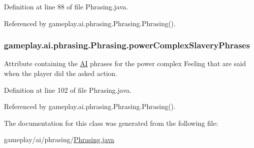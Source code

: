 Definition at line 88 of file Phrasing.\-java.



Referenced by gameplay.\-ai.\-phrasing.\-Phrasing.\-Phrasing().

\hypertarget{a00018_afc6cf63da008d88b88e0e8138bb2fda9}{
\subsubsection[{power\-Complex\-Slavery\-Phrases}]{ gameplay.\-ai.\-phrasing.\-Phrasing.\-power\-Complex\-Slavery\-Phrases\hspace{0.3cm}{\ttfamily [protected]}}}\label{a00018_afc6cf63da008d88b88e0e8138bb2fda9}


Attribute containing the \hyperlink{a00001}{A\-I} phrases for the power complex Feeling that are said when the player did the asked action. 



Definition at line 102 of file Phrasing.\-java.



Referenced by gameplay.\-ai.\-phrasing.\-Phrasing.\-Phrasing().



The documentation for this class was generated from the following file\-:\begin{DoxyCompactItemize}
\item 
gameplay/ai/phrasing/\hyperlink{a00050}{Phrasing.\-java}\end{DoxyCompactItemize}
